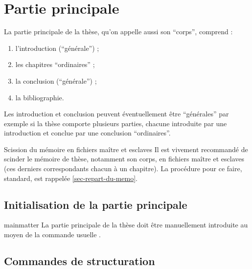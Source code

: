 \chapter{Partie principale}\label{cha-corps}
%

La partie principale de la thèse, qu'on appelle aussi son \enquote{corps},
comprend :
\begin{enumerate}
\item{}%
 l'introduction (\enquote{générale}) ;
\item{}%
  les chapitres \enquote{ordinaires} ;
\item{}%
  la conclusion (\enquote{générale}) ;
\item{}%
  la bibliographie.
\end{enumerate}
Les introduction et conclusion peuvent éventuellement être
\enquote{générales} par exemple si la thèse comporte plusieurs
parties, chacune introduite par une introduction et conclue par
une conclusion \enquote{ordinaires}.

\begin{dbremark}{Scission du mémoire en fichiers maître et esclaves}{}
  Il est vivement recommandé de scinder le mémoire de thèse,
  notamment son corps, en fichiers maître et esclaves (ces derniers
  correspondants chacun à un chapitre). La procédure
  pour ce faire, standard, est rappelée \vref{sec-repart-du-memo}.
\end{dbremark}

\section{Initialisation de la partie principale}

\begin{docCommand}[doc description=\mandatory]{mainmatter}{}
  La partie principale de la thèse doit être manuellement introduite au moyen
  de la commande usuelle \nofrontmatter.
\end{docCommand}

\section{Commandes de structuration}


